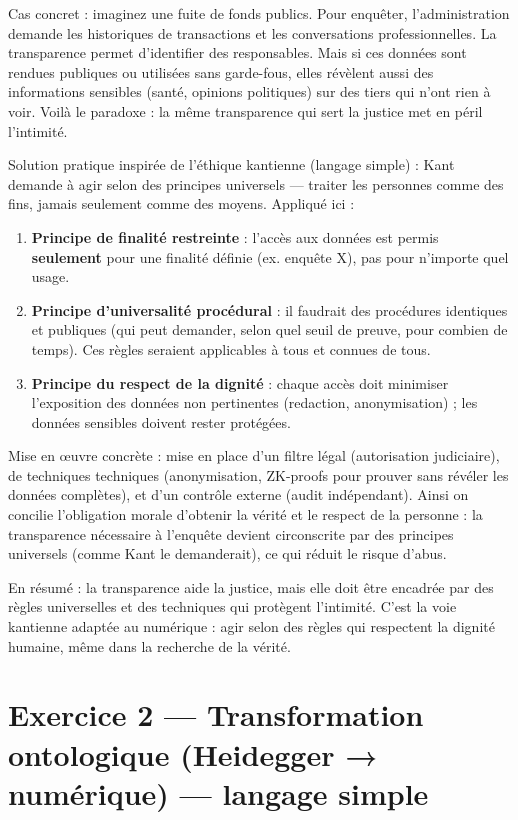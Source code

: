 \documentclass[12pt,a4paper]{article}
\begin{document}
	Cas concret : imaginez une fuite de fonds publics. Pour enquêter, l’administration demande les historiques de transactions et les conversations professionnelles. La transparence permet d’identifier des responsables. Mais si ces données sont rendues publiques ou utilisées sans garde-fous, elles révèlent aussi des informations sensibles (santé, opinions politiques) sur des tiers qui n’ont rien à voir. Voilà le paradoxe : la même transparence qui sert la justice met en péril l’intimité.
	
	Solution pratique inspirée de l’éthique kantienne (langage simple) : Kant demande à agir selon des principes universels — traiter les personnes comme des fins, jamais seulement comme des moyens. Appliqué ici :
	
	\begin{enumerate}
		\item \textbf{Principe de finalité restreinte} : l’accès aux données est permis \textbf{seulement} pour une finalité définie (ex. enquête X), pas pour n’importe quel usage.
		\item \textbf{Principe d’universalité procédural} : il faudrait des procédures identiques et publiques (qui peut demander, selon quel seuil de preuve, pour combien de temps). Ces règles seraient applicables à tous et connues de tous.
		\item \textbf{Principe du respect de la dignité} : chaque accès doit minimiser l’exposition des données non pertinentes (redaction, anonymisation) ; les données sensibles doivent rester protégées.
	\end{enumerate}
	
	Mise en œuvre concrète : mise en place d’un filtre légal (autorisation judiciaire), de techniques techniques (anonymisation, ZK-proofs pour prouver sans révéler les données complètes), et d’un contrôle externe (audit indépendant). Ainsi on concilie l’obligation morale d’obtenir la vérité et le respect de la personne : la transparence nécessaire à l’enquête devient circonscrite par des principes universels (comme Kant le demanderait), ce qui réduit le risque d’abus.
	
	En résumé : la transparence aide la justice, mais elle doit être encadrée par des règles universelles et des techniques qui protègent l’intimité. C’est la voie kantienne adaptée au numérique : agir selon des règles qui respectent la dignité humaine, même dans la recherche de la vérité.
	
	\section*{Exercice 2 — Transformation ontologique (Heidegger → numérique) — langage simple}
	
\end{document}
